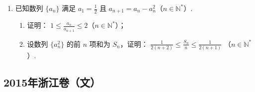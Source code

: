\begin{description}
\begin{enumerate}[leftmargin=5pt]
        \item 已知数列 \(\{a_{n}\}\) 满足 \(a_1 = \frac{1}{2}\) 且 \(a_{n + 1} = a_n - a_n^2\)（\(n\in \mathbb{N}^*\)）.
\begin{enumerate}
\item 证明： \(1 \leqslant \frac{a_n}{a_{n+1}} \leqslant 2\)（\(n \in \mathbb{N}^*\)）；
\item 设数列 \(\{a_n^2\}\) 的前 \(n\) 项和为 \(S_n\)，证明： \(\frac{1}{2(n+2)} \leqslant \frac{S_n}{n} \leqslant \frac{1}{2(n+1)}\) （\(n \in \mathbb{N}^*\)）.
\end{enumerate}

    \end{enumerate}

\end{description}


\subsection{2015年浙江卷（文）}\label{gk:2015年浙江卷（文）}

